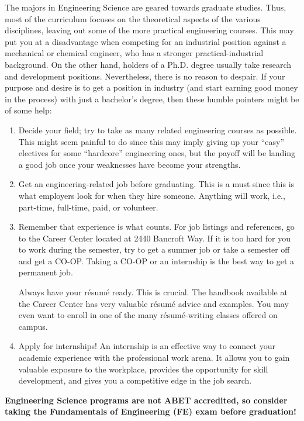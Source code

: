 The majors in Engineering Science are geared towards graduate studies. Thus, most of the curriculum focuses on the theoretical aspects of the various disciplines, leaving out some of the more practical engineering courses. This may put you at a disadvantage when competing for an industrial position against a mechanical or chemical engineer, who has a stronger practical-industrial background. On the other hand, holders of a Ph.D. degree usually take research and development positions. Nevertheless, there is no reason to despair. If your purpose and desire is to get a position in industry (and start earning good money in the process) with just a bachelor’s degree, then these humble pointers might be of some help:

\begin{enumerate}
  \item Decide your field; try to take as many related engineering courses as possible. This might seem painful to do since this may imply giving up your “easy” electives for some “hardcore” engineering ones, but the payoff will be landing a good job once your weaknesses have become your strengths.
  \item Get an engineering-related job before graduating. This is a must since this is what employers look for when they hire someone. Anything will work, i.e., part-time, full-time, paid, or volunteer.
  \item Remember that experience is what counts. For job listings and references, go to the Career Center located at 2440 Bancroft Way. If it is too hard for you to work during the semester, try to get a summer job or take a semester off and get a CO-OP. Taking a CO-OP or an internship is the best way to get a permanent job. 
  
  Always have your r\'{e}sum\'{e} ready. This is crucial. The handbook available at the Career Center has very valuable r\'{e}sum\'{e} advice and examples. You may even want to enroll in one of the many r\'{e}sum\'{e}-writing classes offered on campus.
  \item Apply for internships! An internship is an effective way to connect your academic experience with the professional work arena. It allows you to gain valuable exposure to the workplace, provides the opportunity for skill development, and gives you a competitive edge in the job search.
\end{enumerate}

\textbf{Engineering Science programs are not ABET accredited, so consider taking the Fundamentals of Engineering (FE) exam before graduation!}


